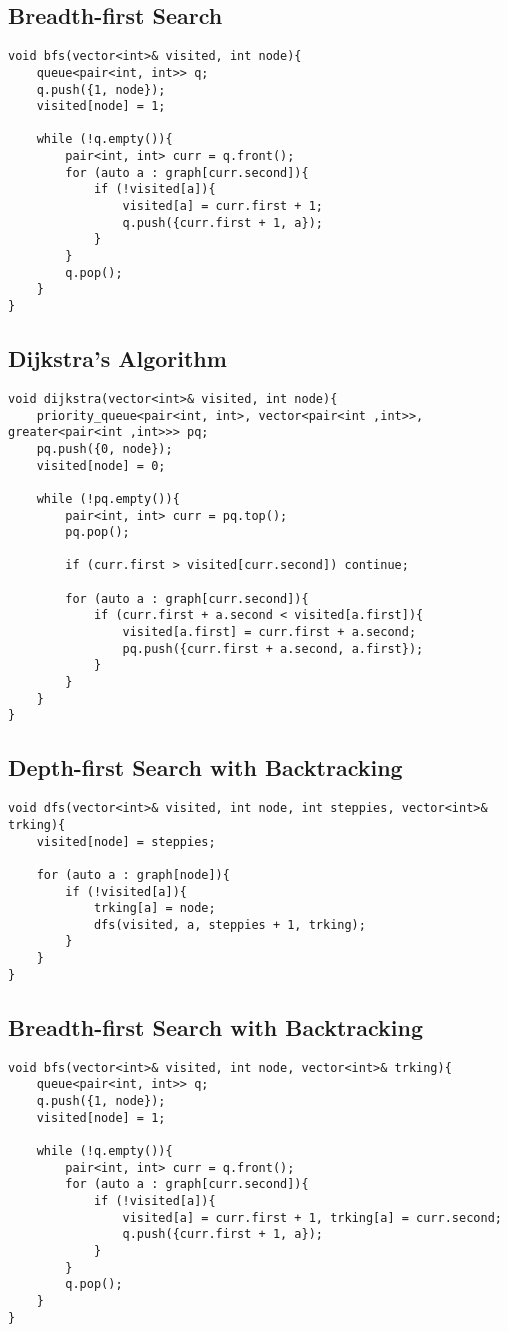 \documentclass{article}
\begin{document}
\subsection{Breadth-first Search}
\begin{verbatim}  
void bfs(vector<int>& visited, int node){
    queue<pair<int, int>> q;
    q.push({1, node});
    visited[node] = 1;

    while (!q.empty()){
        pair<int, int> curr = q.front();
        for (auto a : graph[curr.second]){
            if (!visited[a]){
                visited[a] = curr.first + 1;
                q.push({curr.first + 1, a});
            }
        }
        q.pop();
    }
}
\end{verbatim}

\subsection{Dijkstra's Algorithm}
\begin{verbatim}
void dijkstra(vector<int>& visited, int node){
    priority_queue<pair<int, int>, vector<pair<int ,int>>, greater<pair<int ,int>>> pq;
    pq.push({0, node});
    visited[node] = 0;

    while (!pq.empty()){
        pair<int, int> curr = pq.top();
        pq.pop();

        if (curr.first > visited[curr.second]) continue;
        
        for (auto a : graph[curr.second]){
            if (curr.first + a.second < visited[a.first]){
                visited[a.first] = curr.first + a.second;
                pq.push({curr.first + a.second, a.first});
            }
        }
    }
}
\end{verbatim}

\subsection{Depth-first Search with Backtracking}
\begin{verbatim}
void dfs(vector<int>& visited, int node, int steppies, vector<int>& trking){
    visited[node] = steppies;

    for (auto a : graph[node]){
        if (!visited[a]){
            trking[a] = node;
            dfs(visited, a, steppies + 1, trking);
        }
    }
}
\end{verbatim}

\subsection{Breadth-first Search with Backtracking}
\begin{verbatim}
void bfs(vector<int>& visited, int node, vector<int>& trking){
    queue<pair<int, int>> q;
    q.push({1, node});
    visited[node] = 1;

    while (!q.empty()){
        pair<int, int> curr = q.front();
        for (auto a : graph[curr.second]){
            if (!visited[a]){
                visited[a] = curr.first + 1, trking[a] = curr.second;
                q.push({curr.first + 1, a});
            }
        }
        q.pop();
    }
}
\end{verbatim}
\end{document}
